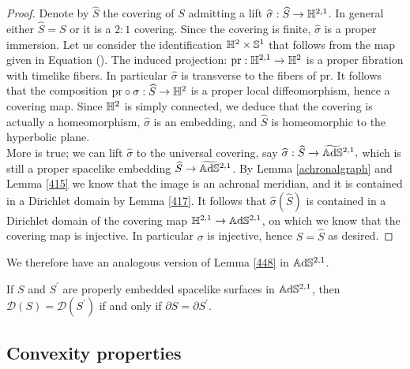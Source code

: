 \begin{proof}

    Denote by $\widehat{S}$ the covering of $S$ admitting a lift $\widehat{\sigma}:\widehat{S}\to\mathbb{H}^{2,1}$. In general either $\widehat{S}=S$ or it is a $2:1$ covering. Since the covering is finite, $\widehat{\sigma}$ is a proper immersion. Let us consider the identification $\mathbb{H}^2\times\mathbb{S}^1$ that follows from the map given in Equation (). The induced projection: $\text{pr}:\mathbb{H}^{2,1}\to\mathbb{H}^2$ is a proper fibration with timelike fibers. In particular $\widehat{\sigma}$ is transverse to the fibers of $\text{pr}.$ It follows that the composition $\text{pr}\circ\sigma:\widehat{S}\to\mathbb{H}^2$ is a proper local diffeomorphism, hence a covering map. Since $\mathbb{H}^2$ is simply connected, we deduce that the covering is actually a homeomorphism, $\widehat{\sigma}$ is an embedding, and $\widehat{S}$ is homeomorphic to the hyperbolic plane. \\
    More is true; we can lift $\widehat{\sigma}$ to the universal covering, say $\widehat{\sigma}:\widehat{S}\to\widetilde{\mathbb{A}\mathrm{d}\mathbb{S}}{}^{2,1},$ which is still a proper spacelike embedding $\widehat{S}\to \widetilde{\mathbb{A}\mathrm{d}\mathbb{S}}{}^{2,1}$. By Lemma \ref{achronalgraph} and Lemma \ref{415} we know that the image is an achronal meridian, and it is contained in a Dirichlet domain by Lemma \ref{417}. It follows that $\widehat{\sigma}(\widehat{S})$ is contained in a Dirichlet domain of the covering map $\mathbb{H}^{2,1}\to\mathbb{A}\mathrm{d}\mathbb{S}^{2,1}$, on which we know that the covering map is injective. In particular $\sigma$ is injective, hence $S=\widehat{S}$ as desired.  
\end{proof}


We therefore have an analogous version of Lemma \ref{448} in $\mathbb{A}\mathrm{d}\mathbb{S}^{2,1}$.

\begin{corollary}
    If $S$ and $S^{\prime}$ are properly embedded spacelike surfaces in $\mathbb{A}\mathrm{d}\mathbb{S}^{2,1}$, then $\mathcal{D}(S)=\mathcal{D}(S^{\prime})$ if and only if $\partial S=\partial S^{\prime}$. 
\end{corollary}

\subsection{Convexity properties}

